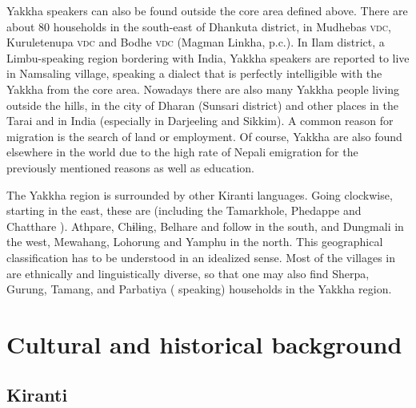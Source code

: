 Yakkha speakers can also be found outside the core area defined above. There are about 80 households in the south-east of Dhankuta district, in Mudhebas \textsc{vdc}, Kuruletenupa \textsc{vdc} and Bodhe \textsc{vdc} (Magman Linkha, p.c.). In Ilam district, a Limbu-speaking region bordering with India, Yakkha speakers are reported to live in Namsaling village, speaking a dialect that is perfectly intelligible with the Yakkha from the core area. Nowadays there are also many Yakkha people living outside the hills, in the city of Dharan (Sunsari district) and other places in the Tarai and in India (especially in Darjeeling and Sikkim). A common reason for migration is the search of land or employment. Of course, Yakkha are also found elsewhere in the world due to the high rate of Nepali emigration for the previously mentioned reasons as well as education. 

The Yakkha region is surrounded by other Kiranti languages. Going clockwise, starting in the east, these are  (including the Tamarkhole, Phedappe  and Chatthare ). Athpare,  Chɨlɨng, Belhare and  follow in the south,  and Dungmali in the west, Mewahang, Lohorung and Yamphu in the north. This geographical classification has to be understood in an idealized sense. Most of the villages in  are ethnically and linguistically diverse, so that one may also find Sherpa, Gurung, Tamang,  and Parbatiya ( speaking) households in the Yakkha region.

  

\section{Cultural and historical background}\label{cult-hist}

\subsection{Kiranti}


